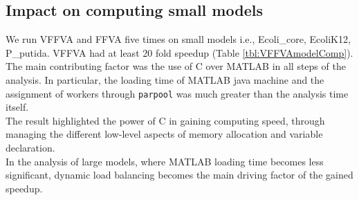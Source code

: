 \subsection*{Impact on computing small models}
We run VFFVA and FFVA five times on small models i.e., Ecoli\_core, EcoliK12, P\_putida. VFFVA had at least 20 fold speedup (Table \ref{tbl:VFFVAmodelComp}). The main contributing factor was the use of C over MATLAB in all steps of the analysis. In particular, the loading time of MATLAB java machine and the assignment of workers through \texttt{parpool} was much greater than the analysis time itself.\\
The result highlighted the power of C in gaining computing speed, through managing the different low-level aspects of memory allocation and variable declaration.\\
In the analysis of large models, where MATLAB loading time becomes less significant, dynamic load balancing becomes the main driving factor of the gained speedup.\\ 
